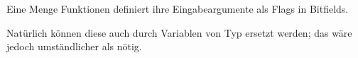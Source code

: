 \mysection{\BitfieldsChapter}
\label{sec:bitfields}
Eine Menge Funktionen definiert ihre Eingabeargumente als Flags in Bitfields.

Natürlich können diese auch durch Variablen von Typ \Tbool ersetzt werden; das
wäre jedoch umständlicher als nötig.








